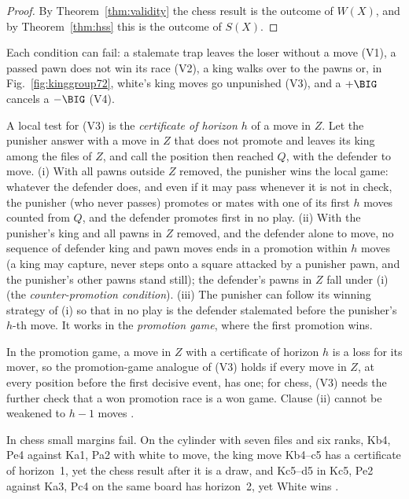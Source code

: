 \begin{proof}
By Theorem~\ref{thm:validity} the chess result is the outcome of $W(X)$, and by Theorem~\ref{thm:hss} this is
the outcome of $S(X)$.
\end{proof}

Each condition can fail: a stalemate trap leaves the loser without a move (V1), a passed pawn does not win its
race (V2), a king walks over to the pawns or, in Fig.~\ref{fig:kinggroup72}, white's king moves go unpunished
(V3), and a $+\BIG$ cancels a $-\BIG$ (V4).

A local test for (V3) is the \emph{certificate of horizon $h$} of a move in $Z$. Let the punisher answer with a move in $Z$ that does not promote and leaves its king among
the files of $Z$, and call the position then reached $Q$, with the defender to move. (i) With all pawns outside $Z$ removed, the punisher wins the local game: whatever the defender does, and
even if it may pass whenever it is not in check, the punisher (who never passes) promotes or mates with one of its first $h$ moves counted from $Q$, and the defender promotes first
in no play. (ii) With the punisher's king and all pawns in $Z$ removed, and the defender alone to move, no sequence of defender king and pawn moves ends in a promotion within $h$
moves (a king may capture, never steps onto a square attacked by a punisher pawn, and the punisher's other pawns stand still); the defender's pawns in $Z$ fall under (i) (the \emph{counter-promotion condition}). (iii)
The punisher can follow its winning strategy of (i) so that in no play is the defender stalemated before the punisher's $h$-th move. It works in the \emph{promotion game}, where the first promotion wins.

\begin{theorem}[\lab{S}]\label{thm:cert}
In the promotion game, a move in $Z$ with a certificate of horizon $h$ is a loss for its mover, so the
promotion-game analogue of (V3) holds if every move in $Z$, at every position before the first decisive event, has one; for chess, (V3) needs the further
check that a won promotion race is a won game. Clause (ii) cannot be weakened to $h-1$ moves .
\end{theorem}

In chess small margins fail. On the cylinder with seven files and six ranks, Kb4, Pe4 against Ka1, Pa2 with
white to move, the king move Kb4--c5 has a certificate of horizon~1, yet the chess result after it is a draw, and
Kc5--d5 in Kc5, Pe2 against Ka3, Pc4 on the same board has horizon~2, yet White wins .

